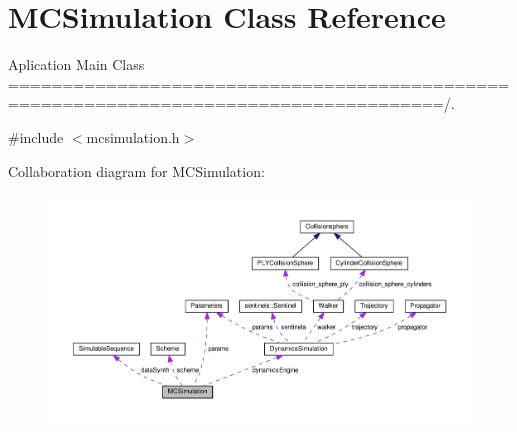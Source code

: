 \hypertarget{class_m_c_simulation}{}\section{M\+C\+Simulation Class Reference}
\label{class_m_c_simulation}


Aplication Main Class ======================================================================================/.  




{\ttfamily \#include $<$mcsimulation.\+h$>$}



Collaboration diagram for M\+C\+Simulation\+:
\nopagebreak
\begin{figure}[H]
\begin{center}
\leavevmode
\includegraphics[width=350pt]{class_m_c_simulation__coll__graph}
\end{center}
\end{figure}
